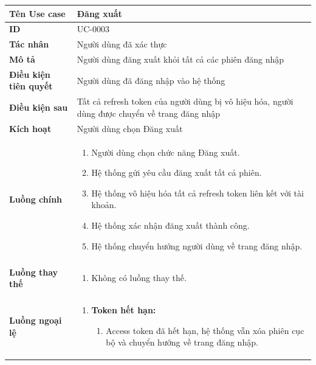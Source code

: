 {
\renewcommand{\arraystretch}{1.5}

\begin{tabularx}{\textwidth}{|>{\raggedright\arraybackslash}X|>{\raggedright\arraybackslash}X|}
\hline
\textbf{Tên Use case} & Đăng xuất \\
\hline
\textbf{ID} & UC-0003 \\
\hline
\textbf{Tác nhân} & Người dùng đã xác thực \\
\hline
\textbf{Mô tả} & Người dùng đăng xuất khỏi tất cả các phiên đăng nhập \\
\hline
\textbf{Điều kiện tiên quyết} & Người dùng đã đăng nhập vào hệ thống \\
\hline
\textbf{Điều kiện sau} & Tất cả refresh token của người dùng bị vô hiệu hóa, người dùng được chuyển về trang đăng nhập \\
\hline
\textbf{Kích hoạt} & Người dùng chọn Đăng xuất \\
\hline
\textbf{Luồng chính} &
\begin{enumerate}
    \item Người dùng chọn chức năng Đăng xuất.
    \item Hệ thống gửi yêu cầu đăng xuất tất cả phiên.
    \item Hệ thống vô hiệu hóa tất cả refresh token liên kết với tài khoản.
    \item Hệ thống xác nhận đăng xuất thành công.
    \item Hệ thống chuyển hướng người dùng về trang đăng nhập.
\end{enumerate} \\
\hline
\textbf{Luồng thay thế} &
\begin{enumerate}
    \item Không có luồng thay thế.
\end{enumerate} \\
\hline
\textbf{Luồng ngoại lệ} &
\begin{enumerate}
    \item \textbf{Token hết hạn:}
    \begin{enumerate}
        \item[2Err.] Access token đã hết hạn, hệ thống vẫn xóa phiên cục bộ và chuyển hướng về trang đăng nhập.
    \end{enumerate}
\end{enumerate} \\
\hline
\end{tabularx}
}
